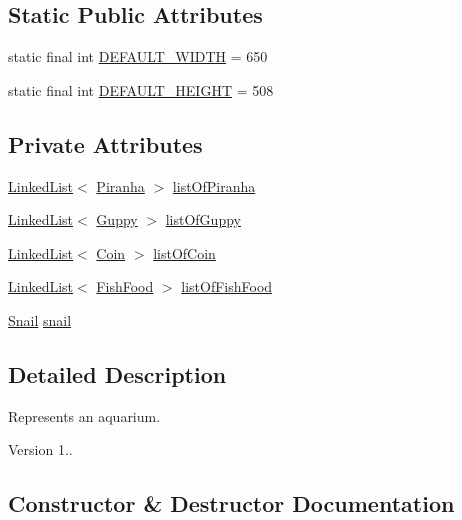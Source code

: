 \subsection*{Static Public Attributes}
\begin{DoxyCompactItemize}
\item 
static final int \mbox{\hyperlink{class_aquarium_a1434fb962b1f08bc4f597b14b15431bb}{D\+E\+F\+A\+U\+L\+T\+\_\+\+W\+I\+D\+TH}} = 650
\item 
static final int \mbox{\hyperlink{class_aquarium_a65cefc6de1690de8d537d19940bd8e01}{D\+E\+F\+A\+U\+L\+T\+\_\+\+H\+E\+I\+G\+HT}} = 508
\end{DoxyCompactItemize}
\subsection*{Private Attributes}
\begin{DoxyCompactItemize}
\item 
\mbox{\hyperlink{class_linked_list}{Linked\+List}}$<$ \mbox{\hyperlink{class_piranha}{Piranha}} $>$ \mbox{\hyperlink{class_aquarium_a21cb53c360484e651bde146b4645ca4a}{list\+Of\+Piranha}}
\item 
\mbox{\hyperlink{class_linked_list}{Linked\+List}}$<$ \mbox{\hyperlink{class_guppy}{Guppy}} $>$ \mbox{\hyperlink{class_aquarium_a020d5cd650fba937c38d7b25aed6effd}{list\+Of\+Guppy}}
\item 
\mbox{\hyperlink{class_linked_list}{Linked\+List}}$<$ \mbox{\hyperlink{class_coin}{Coin}} $>$ \mbox{\hyperlink{class_aquarium_a26c4ffdfd5ee2c9819a1125ad5c077d1}{list\+Of\+Coin}}
\item 
\mbox{\hyperlink{class_linked_list}{Linked\+List}}$<$ \mbox{\hyperlink{class_fish_food}{Fish\+Food}} $>$ \mbox{\hyperlink{class_aquarium_a17e3ff17ab95a5d3d45780eae72448c7}{list\+Of\+Fish\+Food}}
\item 
\mbox{\hyperlink{class_snail}{Snail}} \mbox{\hyperlink{class_aquarium_a181508459b3020488aa97664daeb79ac}{snail}}
\end{DoxyCompactItemize}


\subsection{Detailed Description}
Represents an aquarium. \begin{DoxyVersion}{Version}
1.. 
\end{DoxyVersion}


\subsection{Constructor \& Destructor Documentation}
\mbox{\label{class_aquarium_a173f8b85de9d2f61c02d13ebdc05026c}} 
